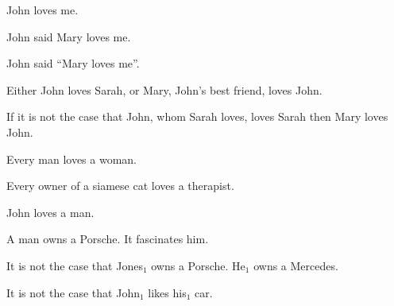 \begin{exe}
   John loves me.
  \dotfill \pageref{ex:deixis}
\end{exe}

\begin{exe}
   John said Mary loves me.
  \dotfill \pageref{ex:indirect-speech}
\end{exe}

\begin{exe}
   John said ``Mary loves me''.
  \dotfill \pageref{ex:direct-speech}
\end{exe}

\begin{exe}
   Either John loves Sarah, or Mary, John's best friend, loves John.
  \dotfill \pageref{ex:either-or}
\end{exe}

\begin{exe}
   If it is not the case that John, whom Sarah loves, loves Sarah then Mary loves John.
  \dotfill \pageref{ex:if-not}
\end{exe}

\begin{exe}
   Every man loves a woman.
  \dotfill \pageref{ex:quantifiers}
\end{exe}

\begin{exe}
   Every owner of a siamese cat loves a therapist.
  \dotfill \pageref{ex:siamese}
\end{exe}

\begin{exe}
   John loves a man.
  \dotfill \pageref{ex:mixed-nps}
\end{exe}

\begin{exe}
   A man owns a Porsche. It fascinates him.
  \dotfill \pageref{ex:man-porsche}
\end{exe}

\begin{exe}
   It is not the case that Jones$_1$ owns a
  Porsche. He$_1$ owns a Mercedes.
  \dotfill \pageref{ex:jones-mercedes}
\end{exe}

\begin{exe}
   It is not the case that John$_1$ likes his$_1$ car.
  \dotfill \pageref{ex:not-john-car}
\end{exe}

